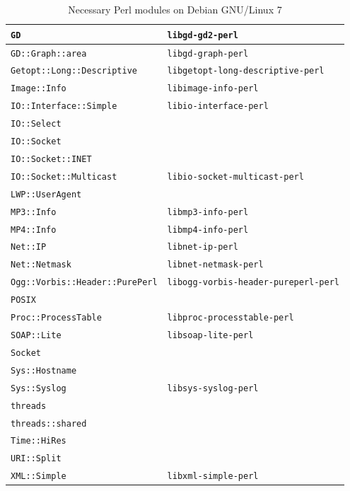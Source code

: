 \documentclass[a4paper,oneside,10pt]{report}
\begin{document}
\begin{table}
\begin{tabular}{|p{15em}|p{18em}|}
		\hline
		\verb|GD| 														& \verb|libgd-gd2-perl| \\
		\hline
		\verb|GD::Graph::area| 								& \verb|libgd-graph-perl| \\
		\hline
		\verb|Getopt::Long::Descriptive| 			& \verb|libgetopt-long-descriptive-perl| \\
		\hline
		\verb|Image::Info| 										& \verb|libimage-info-perl| \\
		\hline
		\verb|IO::Interface::Simple| 					& \verb|libio-interface-perl| \\
		\hline
		\verb|IO::Select| 										& \\
		\hline
		\verb|IO::Socket| 										& \\
		\hline
		\verb|IO::Socket::INET| 							& \\
		\hline
		\verb|IO::Socket::Multicast| 					& \verb|libio-socket-multicast-perl| \\
		\hline
		\verb|LWP::UserAgent| 								& \\
		\hline
		\verb|MP3::Info| 											& \verb|libmp3-info-perl| \\
		\hline
		\verb|MP4::Info| 											& \verb|libmp4-info-perl| \\
		\hline
		\verb|Net::IP| 												& \verb|libnet-ip-perl| \\
		\hline
		\verb|Net::Netmask| 									& \verb|libnet-netmask-perl| \\
		\hline
		\verb|Ogg::Vorbis::Header::PurePerl| 	& \verb|libogg-vorbis-header-pureperl-perl| \\
		\hline
		\verb|POSIX| 													& \\
		\hline
		\verb|Proc::ProcessTable| 						& \verb|libproc-processtable-perl| \\
		\hline
		\verb|SOAP::Lite| 										& \verb|libsoap-lite-perl| \\
		\hline
		\verb|Socket| 												& \\
		\hline
		\verb|Sys::Hostname| 									& \\
		\hline
		\verb|Sys::Syslog| 										& \verb|libsys-syslog-perl| \\
		\hline
		\verb|threads| 												& \\
		\hline
		\verb|threads::shared| 								& \\
		\hline
		\verb|Time::HiRes|										& \\
		\hline
		\verb|URI::Split| 										& \\
		\hline
		\verb|XML::Simple| 										& \verb|libxml-simple-perl| \\
		\hline
	\end{tabular}
	\caption{Necessary Perl modules on Debian GNU/Linux 7}
	\label{tab:NecessaryPerlModulesDebian7}
\end{table}
\end{document}
